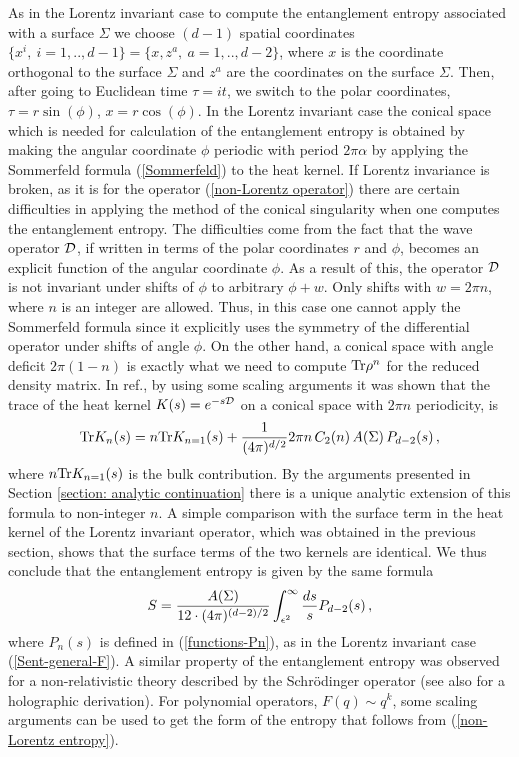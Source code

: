\documentclass[12pt]{article}
\def\Tr{\hbox{Tr}}
\def\lb{\label}
\def\o{\over}
\begin{document}
As in the Lorentz invariant case to compute the entanglement entropy associated with a surface $\Sigma$ we choose  $(d-1)$ spatial coordinates $\{x^i,~i=1,..,d-1\}=\{x,z^a, ~a=1,..,d-2\}$, where $x$ is the coordinate orthogonal to the surface $\Sigma$ and $z^a$ are the coordinates on the surface $\Sigma$. Then, after going to Euclidean time $\tau=i t$, we switch to the polar coordinates, $\tau=r\sin(\phi)$, $x=r\cos(\phi)$.  In the Lorentz invariant case  the conical space which is needed for calculation of the entanglement entropy is obtained by making the angular coordinate $\phi$ periodic with  period $2\pi \alpha$ by applying the Sommerfeld formula (\ref{Sommerfeld}) to the heat kernel.
If  Lorentz invariance is broken, as it is for the operator (\ref{non-Lorentz operator}) there are  certain difficulties in applying the method of the conical singularity when one computes the entanglement entropy.
The difficulties come from the fact that the wave operator $\cal D$, if written in terms of the polar coordinates $r$ and $\phi$, becomes an explicit function of the angular coordinate $\phi$. As a result of this, the operator $\cal D$ is not invariant under shifts of $\phi$ to arbitrary  $\phi+w$.  Only shifts with $w=2\pi n$, where $n$ is an integer are allowed. Thus, in this case one cannot apply the Sommerfeld formula since it explicitly uses the symmetry of the differential operator under shifts of angle $\phi$.
On the other hand,  a conical space with angle deficit $2\pi (1-n)$ is exactly what we need to compute $\Tr \rho^n$ for the reduced density matrix. In ref.\cite{Nesterov:2010yi},
by using some  scaling arguments it was shown that the trace of the heat kernel $K(s)=e^{-s{\cal D}}$  on a conical space with $2\pi n$ periodicity, is
 \begin{equation} \lb{trace  non-Lorentz heat kernel}
  \Tr K_n(s)=n\Tr K_{n=1}(s)+\frac{1}{(4\pi)^{d/2}} 2\pi n\,C_2(n)\,A(\Sigma)\,P_{d-2}(s) \, ,
 \end{equation}
where $n\Tr K_{n=1}(s)$ is the bulk contribution. By the arguments presented in Section \ref{section: analytic continuation} there is a unique analytic extension of this formula to non-integer $n$. A simple comparison with the surface term in the heat kernel  of the
Lorentz invariant operator, which was obtained in the previous section, shows that the surface terms of  the two kernels are identical. We thus conclude that the entanglement entropy is given by the same formula
 \begin{equation} \lb{non-Lorentz entropy}
  S=\frac{A(\Sigma)}{12\cdot (4\pi)^{(d{-}2)/2}}
  \int_{\epsilon^2}^\infty {ds\o s}P_{d-2}(s)\, ,
 \end{equation}
where $P_n(s)$ is defined in (\ref{functions-Pn}), as in the Lorentz invariant case  (\ref{Sent-general-F}). A similar property of the entanglement entropy was observed for a non-relativistic theory described by the Schr\"{o}dinger operator \cite{Solodukhin:2009sk} (see also \cite{deBoer:2011wk} for a holographic derivation). For polynomial operators, $F(q)\sim q^k$, some scaling arguments can be  used \cite{Solodukhin:2009sk} to get the form of the entropy  that follows from (\ref{non-Lorentz entropy}).
\end{document}
